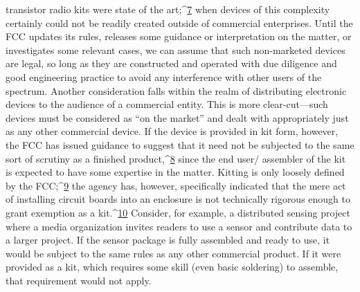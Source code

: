 transistor radio kits were state of the art;^{\href{#endnotes-hord}{7}} when devices of this complexity
certainly could not be readily created outside of commercial enterprises.
Until the FCC updates its rules, releases some guidance or interpretation on
the matter, or investigates some relevant cases, we can assume that such
non-marketed devices are legal, so long as they are constructed and operated
with due diligence and good engineering practice to avoid any interference
with other users of the spectrum.
Another consideration falls within the realm of distributing electronic
devices to the audience of a commercial entity. This is more clear-cut—such
devices must be considered as ``on the market'' and dealt with appropriately
just as any other commercial device. If the device is provided in kit form,
however, the FCC has issued guidance to suggest that it need not be subjected
to the same sort of scrutiny as a finished product,^{\href{#endnotes-hord}{8}} since the end user/
assembler of the kit is expected to have some expertise in the matter. Kitting
is only loosely defined by the FCC;^{\href{#endnotes-hord}{9}} the agency has, however, specifically
indicated that the mere act of installing circuit boards into an enclosure is
not technically rigorous enough to grant exemption as a kit.^{\href{#endnotes-hord}{10}}
Consider, for example, a distributed sensing project where a media organization
invites readers to use a sensor and contribute data to a larger project.
If the sensor package is fully assembled and ready to use, it would be subject
to the same rules as any other commercial product. If it were provided
as a kit, which requires some skill (even basic soldering) to assemble, that
requirement would not apply.

